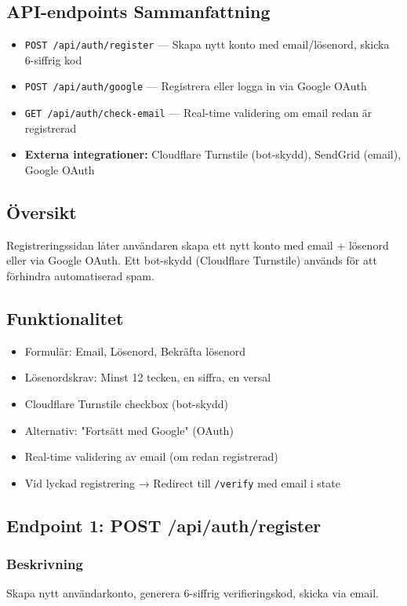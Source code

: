 \documentclass[12pt,a4paper]{article}
\begin{document}
\subsection{API-endpoints Sammanfattning}
\begin{itemize}[noitemsep]
  \item \texttt{POST /api/auth/register} — Skapa nytt konto med email/lösenord, skicka 6-siffrig kod
  \item \texttt{POST /api/auth/google} — Registrera eller logga in via Google OAuth
  \item \texttt{GET /api/auth/check-email} — Real-time validering om email redan är registrerad
  \item \textbf{Externa integrationer:} Cloudflare Turnstile (bot-skydd), SendGrid (email), Google OAuth
\end{itemize}

\subsection{Översikt}
Registreringssidan låter användaren skapa ett nytt konto med email + lösenord eller via Google OAuth. Ett bot-skydd (Cloudflare Turnstile) används för att förhindra automatiserad spam.

\subsection{Funktionalitet}
\begin{itemize}[noitemsep]
  \item Formulär: Email, Lösenord, Bekräfta lösenord
  \item Lösenordskrav: Minst 12 tecken, en siffra, en versal
  \item Cloudflare Turnstile checkbox (bot-skydd)
  \item Alternativ: "Fortsätt med Google" (OAuth)
  \item Real-time validering av email (om redan registrerad)
  \item Vid lyckad registrering → Redirect till \texttt{/verify} med email i state
\end{itemize}

\subsection{Endpoint 1: POST /api/auth/register}

\subsubsection{Beskrivning}
Skapa nytt användarkonto, generera 6-siffrig verifieringskod, skicka via email.
\end{document}
